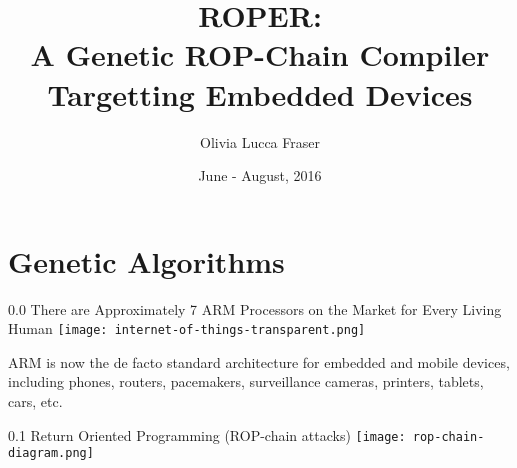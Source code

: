 \documentclass[9pt]{beamer}
\title{ROPER:\\A Genetic ROP-Chain Compiler Targetting Embedded Devices}
\author{Olivia Lucca Fraser}
\date{June - August, 2016}
\institute{NIMS Lab, Dalhousie University}
\begin{document}
\maketitle


\section{Genetic Algorithms}

\begin{frame}{0.0 There are Approximately 7 ARM Processors on the Market for Every Living Human}
\texttt{[image: internet-of-things-transparent.png]}

ARM is now the de facto standard architecture for embedded and mobile devices, including phones, routers, pacemakers, surveillance cameras, printers, tablets, cars, etc.
\end{frame}

\begin{frame}{0.1 Return Oriented Programming (ROP-chain attacks)}
\texttt{[image: rop-chain-diagram.png]}
\end{frame}
\end{document}
